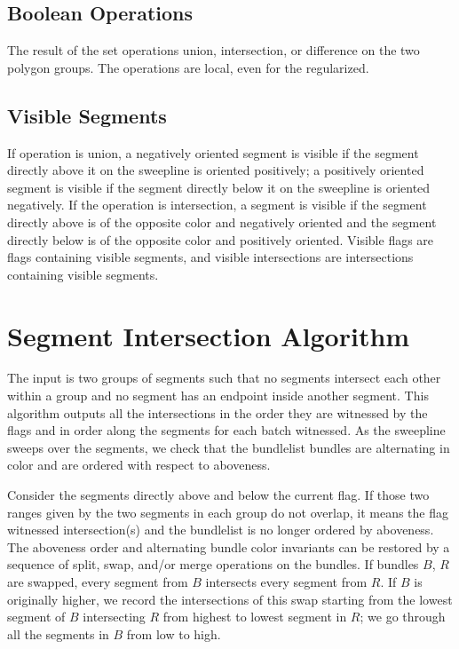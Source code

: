 \documentclass[11pt]{article}
\begin{document}
\subsection{Boolean Operations}
The result of the set operations union, intersection, or difference on the two polygon groups.
The operations are local, even for the regularized. 

\subsection{Visible Segments}
If operation is union, a negatively oriented segment is visible if the segment directly above it on the sweepline is oriented positively; a positively oriented segment is visible if the segment directly below it on the sweepline is oriented negatively.
If the operation is intersection, a segment is visible if the segment directly above is of the opposite color and negatively oriented and the segment directly below is of the opposite color and positively oriented.
Visible flags are flags containing visible segments, and visible intersections are intersections containing visible segments.

\section{Segment Intersection Algorithm} \label{sec inter}
The input is two groups of segments such that no segments intersect each other within a group and no segment has an endpoint inside another segment.
This algorithm outputs all the intersections in the order they are witnessed by the flags and in order along the segments for each batch witnessed.
As the sweepline sweeps over the segments, we check that the bundlelist bundles are alternating in color and are ordered with respect to aboveness.

Consider the segments directly above and below the current flag. 
If those two ranges given by the two segments in each group do not overlap, it means the flag witnessed intersection(s) and the bundlelist is no longer ordered by aboveness.
The aboveness order and alternating bundle color invariants can be restored by a sequence of split, swap, and/or merge operations on the bundles.
If bundles $B$, $R$ are swapped, every segment from $B$ intersects every segment from $R$.
If $B$ is originally higher, we record the intersections of this swap starting from the lowest segment of $B$ intersecting $R$ from highest to lowest segment in $R$; we go through all the segments in $B$ from low to high.
\end{document}
